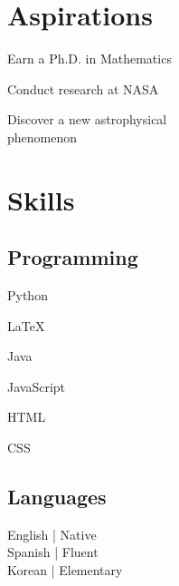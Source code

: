 \documentclass[]{deedy-resume-openfont}
\begin{document}
\begin{minipage}[t]{0.33\textwidth} 


\section{Aspirations}
\vspace{\topsep}
\begin{tightemize}
\item Earn a Ph.D. in Mathematics
\item Conduct research at NASA
\item Discover a new astrophysical \\ phenomenon
\end{tightemize}


\section{Skills}
\subsection{Programming}
\begin{tightemize}
\item Python 
\item \LaTeX
\end{tightemize}


\begin{tightemize}
\item Java
\item JavaScript
\end{tightemize}



\begin{tightemize}
\item HTML 
\item CSS 
\end{tightemize}




\vspace{\topsep}

\subsection{Languages}
English | Native \\
Spanish | Fluent \\
Korean | Elementary \\
\sectionsep



\end{minipage}
\end{document}
